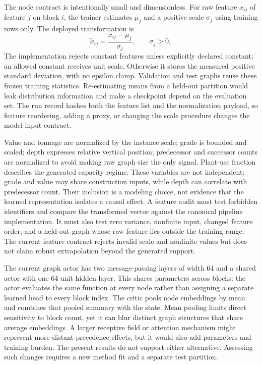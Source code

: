 \documentclass[11pt]{article}
\begin{document}
The node contract is intentionally small and dimensionless. For raw feature $x_{ij}$ of feature $j$ on block $i$, the trainer estimates $\mu_j$ and a positive scale $\sigma_j$ using training rows only. The deployed transformation is
\begin{equation}
\tilde x_{ij}=\frac{x_{ij}-\mu_j}{\sigma_j},\qquad \sigma_j>0,
\label{eq:normalization}
\end{equation}
The implementation rejects constant features unless explicitly declared constant; an allowed constant receives unit scale. Otherwise it stores the measured positive standard deviation, with no epsilon clamp. Validation and test graphs reuse these frozen training statistics. Re-estimating means from a held-out partition would leak distribution information and make a checkpoint depend on the evaluation set. The run record hashes both the feature list and the normalization payload, so feature reordering, adding a proxy, or changing the scale procedure changes the model input contract.

Value and tonnage are normalized by the instance scale; grade is bounded and scaled; depth expresses relative vertical position; predecessor and successor counts are normalized to avoid making raw graph size the only signal. Plant-use fraction describes the generated capacity regime. These variables are not independent: grade and value may share construction inputs, while depth can correlate with predecessor count. Their inclusion is a modeling choice, not evidence that the learned representation isolates a causal effect. A feature audit must test forbidden identifiers and compare the transformed vector against the canonical pipeline implementation. It must also test zero variance, nonfinite input, changed feature order, and a held-out graph whose raw feature lies outside the training range. The current feature contract rejects invalid scale and nonfinite values but does not claim robust extrapolation beyond the generated support.

The current graph actor has two message-passing layers of width 64 and a shared actor with one 64-unit hidden layer. This shares parameters across blocks: the actor evaluates the same function at every node rather than assigning a separate learned head to every block index. The critic pools node embeddings by mean and combines that pooled summary with the state. Mean pooling limits direct sensitivity to block count, yet it can blur distinct graph structures that share average embeddings. A larger receptive field or attention mechanism might represent more distant precedence effects, but it would also add parameters and training burden. The present results do not support either alternative. Assessing such changes requires a new method fit and a separate test partition.
\end{document}
